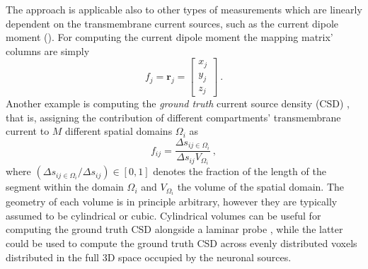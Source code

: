 The approach is applicable also to other types of measurements which are linearly dependent on the transmembrane current sources, 
such as the current dipole moment (). 
For computing the current dipole moment the mapping matrix' columns are simply
%
\begin{equation}
f_{j} = \mathbf{r}_j
= 
\begin{bmatrix}
x_j \\
y_j \\
z_j
\end{bmatrix} ~.
\end{equation}
%
Another example is computing the \textit{ground truth} current source density (CSD) \cite{Pettersen2008,Hagen2016,Hagen2017}, 
that is, assigning the contribution of different compartments' transmembrane current to $M$ different spatial domains $\Omega_i$ as 
%
\begin{equation}
f_{ij} = \frac{\Delta s_{ij\in \Omega_i}}{\Delta s_{ij} V_{\Omega_i}} ~,
\label{eq:LFPy:gtCSD}
\end{equation}
%
where $(\Delta s_{ij\in \Omega_i} / \Delta s_{ij}) \in [0, 1]$ denotes the fraction of the length of the segment within the domain $\Omega_i$ and 
$V_{\Omega_i}$ the volume of the spatial domain. 
The geometry of each volume is in principle arbitrary, 
however they are typically assumed to be cylindrical or cubic. 
Cylindrical volumes can be useful for computing the ground truth CSD alongside a laminar probe \cite{Pettersen2008,Hagen2016,Hagen2017}, 
while the latter could be used to compute the ground truth CSD across evenly distributed voxels distributed in the full 3D space occupied by the neuronal sources. 

